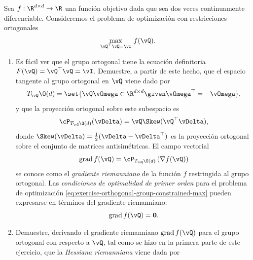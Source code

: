 \documentclass[../../book-main.tex]{subfiles}
\begin{document}
\begin{exercise}
    Sea $f : \R^{d\times d} \to \R$ una función objetivo dada
    que sea dos veces continuamente diferenciable. Consideremos
    el problema de optimización con restricciones ortogonales
    \begin{equation}\label{eq:exercise-orthogonal-group-constrained-max}
        \max_{\vQ^\top \vQ = \vI}\, f(\vQ).
    \end{equation}
    \begin{enumerate}
        \item Es fácil ver que el grupo ortogonal tiene la
            ecuación definitoria $F(\vQ) = \vQ^\top \vQ = \vI$.
            Demuestre, a partir de este hecho, que el espacio tangente al
            grupo ortogonal en $\vQ$ viene dado por
            \begin{equation*}
                T_{\vQ} \O(d) = \set{\vQ \vOmega \in \R^{d\times d}
                \given \vOmega^\top = - \vOmega},
            \end{equation*}
            y que la proyección ortogonal sobre este subespacio es
            \begin{equation*}
                \cP_{T_{\vQ}\O(d)}(\vDelta) =  \vQ \Skew(\vQ^\top \vDelta),
            \end{equation*}
            donde $\Skew(\vDelta) = \tfrac{1}{2} ( \vDelta -
            \vDelta^\top)$ es la proyección ortogonal sobre el conjunto
            de matrices antisimétricas.
            El campo vectorial
            \begin{equation}\label{eq:exercise-riemann-grad-orthogonal-group}
                \mathrm{grad}\, f(\vQ) = \cP_{T_{\vQ} \O(d)} \left(
                \nabla f(\vQ) \right)
            \end{equation}
            se conoce como el \textit{gradiente riemanniano} de la
            función $f$ restringida al grupo ortogonal.
            Las \textit{condiciones de optimalidad de primer orden} para el
            problema de optimización
            \eqref{eq:exercise-orthogonal-group-constrained-max} pueden
            expresarse en términos del gradiente riemanniano:
            \begin{equation*}
                \mathrm{grad}\, f(\vQ) = \mathbf{0}.
            \end{equation*}
        \item Demuestre, derivando el gradiente riemanniano
            $\mathrm{grad}\, f(\vQ)$ para el grupo ortogonal con
            respecto a $\vQ$, tal como se hizo en la primera parte de este ejercicio,
            que la \textit{Hessiana riemanniana} viene dada por 

\end{enumerate}
\end{exercise}
\end{document}
